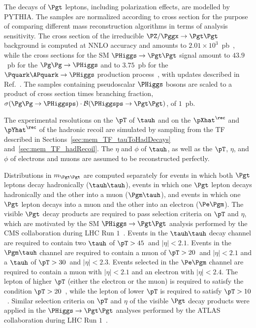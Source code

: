 The decays of $\Pgt$ leptons, including polarization effects, are modelled by PYTHIA.
The samples are normalized according to cross section for the purpose of comparing different mass reconstruction algorithms in terms of analysis sensitivity.
The cross section of the irreducible $\PZ/\Pggx \to \Pgt\Pgt$ background is computed at NNLO accuracy and amounts to $2.01 \times 10^{3}$~pb~\cite{FEWZ},
while the cross sections for the SM $\PHiggs \to \Pgt\Pgt$ signal 
amount to $43.9$~pb for the $\Pg\Pg \to \PHiggs$ and to $3.75$~pb for the $\Pquark\APquark \to \PHiggs$ production process~\cite{Dittmaier:2011ti}, 
with updates described in Ref.~\cite{Heinemeyer:2013tqa}.
The samples containing pseudoscalar $\PHiggs$ bosons are scaled to a product of cross section times branching fraction, 
$\sigma(\Pg\Pg \to \PHiggsps) \cdot \mathcal{B}(\PHiggsps \to \Pgt\Pgt)$, of $1$~pb.

The experimental resolutions on the $\pT$ of $\tauh$ and on the $\pXhat^{\rec}$ and $\pYhat^{\rec}$ of the hadronic recoil 
are simulated by sampling from the TF described in
Sections~\ref{sec:mem_TF_tauToHadDecays}
and~\ref{sec:mem_TF_hadRecoil}.
The $\eta$ and $\phi$ of $\tauh$,
as well as the $\pT$, $\eta$, and $\phi$ of electrons and muons are assumed to be reconstructed perfectly.

Distributions in $m_{\Pgt\Pgt}$ are computed separately for events in which 
both $\Pgt$ leptons decay hadronically ($\tauh\tauh$), 
events in which one $\Pgt$ lepton decays hadronically and the other into a muon ($\Pgm\tauh$),
and events in which one $\Pgt$ lepton decays into a muon and the other into an electron ($\Pe\Pgm$).
The visible $\Pgt$ decay products are required to pass selection criteria on $\pT$ and $\eta$,
which are motivated by the SM $\PHiggs \to \Pgt\Pgt$ analysis performed by the CMS collaboration during LHC Run $1$~\cite{HIG-13-004}.
Events in the $\tauh\tauh$ decay channel are required to contain
two $\tauh$ of $\pT > 45$~\GeV and $\vert\eta\vert < 2.1$.
Events in the $\Pgm\tauh$ channel
are required to contain a muon of $\pT > 20$~\GeV and $\vert\eta\vert < 2.1$ and a $\tauh$ of $\pT > 30$~\GeV and $\vert\eta\vert < 2.3$.
Events selected in the $\Pe\Pgm$ channel are required to contain a muon with $\vert\eta\vert < 2.1$ and an electron with $\vert\eta\vert < 2.4$.
The lepton of higher $\pT$ (either the electron or the muon) is required to satisfy the condition $\pT > 20$~\GeV,
while the lepton of lower $\pT$ is required to satisfy $\pT > 10$~\GeV.
Similar selection criteria on $\pT$ and $\eta$ of the visible $\Pgt$ decay products were applied in the $\PHiggs \to \Pgt\Pgt$
analyses performed by the ATLAS
collaboration during LHC Run $1$~\cite{ATLAS_HiggsTauTau_SM,ATLAS_HiggsTauTau_MSSM}.

